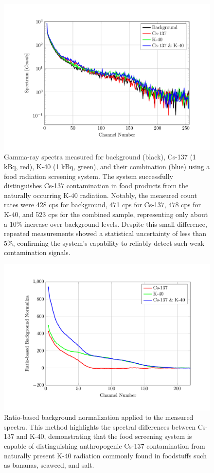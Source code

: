 \documentclass[10pt]{wlscirep}
\begin{document}
\begin{figure}[ht]
\centering
\includegraphics[width=\linewidth]{figure/fig07_FI_SPE.pdf}
\caption{Gamma-ray spectra measured for background (black), Cs-137 (1 kBq, red), K-40 (1 kBq, green), and their combination (blue) using a food radiation screening system. The system successfully distinguishes Cs-137 contamination in food products from the naturally occurring K-40 radiation. Notably, the measured count rates were 428 cps for background, 471 cps for Cs-137, 478 cps for K-40, and 523 cps for the combined sample, representing only about a 10\% increase over background levels. Despite this small difference, repeated measurements showed a statistical uncertainty of less than 5\%, confirming the system's capability to reliably detect such weak contamination signals.}
\label{fig:fi_spe}
\end{figure}

\begin{figure}[ht]
\centering
\includegraphics[width=\linewidth]{figure/fig08_FI_CSN.pdf}
\caption{Ratio-based background normalization applied to the measured spectra. This method highlights the spectral differences between Cs-137 and K-40, demonstrating that the food screening system is capable of distinguishing anthropogenic Cs-137 contamination from naturally present K-40 radiation commonly found in foodstuffs such as bananas, seaweed, and salt.}
\label{fig:fi_csn}
\end{figure}
\end{document}
